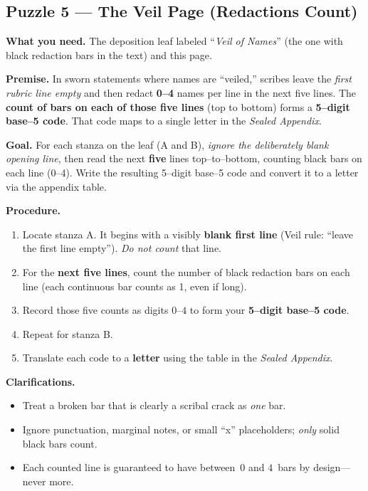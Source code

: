 \documentclass[11pt]{article}
\numberwithin{equation}{section} %
\theoremstyle{plain} %
\theoremstyle{definition} %
\theoremstyle{remark} %
\begin{document}
\subsection{Puzzle 5 --- The Veil Page (Redactions Count)}
\label{pz:veil-page}

\noindent\textbf{What you need.} The deposition leaf labeled ``\textit{Veil of Names}'' (the one with black redaction bars in the text) and this page.

\medskip
\noindent\textbf{Premise.} In sworn statements where names are ``veiled,'' scribes leave the \emph{first rubric line empty} and then redact \textbf{0--4} names per line in the next five lines. The \textbf{count of bars on each of those five lines} (top to bottom) forms a \textbf{5--digit base--5 code}. That code maps to a single letter in the \emph{Sealed Appendix}.

\medskip
\noindent\textbf{Goal.} For each stanza on the leaf (\textsc{A} and \textsc{B}), \emph{ignore the deliberately blank opening line}, then read the next \textbf{five} lines top--to--bottom, counting black bars on each line (0--4). Write the resulting 5--digit base--5 code and convert it to a letter via the appendix table.

\medskip
\noindent\textbf{Procedure.}
\begin{enumerate}\setlength\itemsep{0.2em}
  \item Locate stanza \textsc{A}. It begins with a visibly \textbf{blank first line} (Veil rule: ``leave the first line empty''). \emph{Do not count} that line.
  \item For the \textbf{next five lines}, count the number of black redaction bars on each line (each continuous bar counts as 1, even if long).
  \item Record those five counts as digits \(0\)--\(4\) to form your \textbf{5--digit base--5 code}.
  \item Repeat for stanza \textsc{B}.
  \item Translate each code to a \textbf{letter} using the table in the \emph{Sealed Appendix}.
\end{enumerate}

\medskip
\noindent\textbf{Clarifications.}
\begin{itemize}\setlength\itemsep{0.25em}
  \item Treat a broken bar that is clearly a scribal crack as \emph{one} bar.
  \item Ignore punctuation, marginal notes, or small ``x'' placeholders; \emph{only} solid black bars count.
  \item Each counted line is guaranteed to have between \(\,0\) and \(4\,\) bars by design---never more.
\end{itemize}
\end{document}
